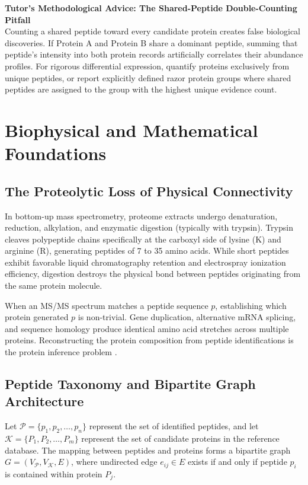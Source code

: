 \documentclass[11pt,twoside,openright]{book}
\begin{document}
\FloatBarrier

\begin{notebox}
\textbf{Tutor's Methodological Advice: The Shared-Peptide Double-Counting Pitfall}\\
Counting a shared peptide toward every candidate protein creates false biological discoveries. If Protein A and Protein B share a dominant peptide, summing that peptide's intensity into both protein records artificially correlates their abundance profiles. For rigorous differential expression, quantify proteins exclusively from unique peptides, or report explicitly defined razor protein groups where shared peptides are assigned to the group with the highest unique evidence count.
\end{notebox}

\section{Biophysical and Mathematical Foundations}

\subsection{The Proteolytic Loss of Physical Connectivity}
In bottom-up mass spectrometry, proteome extracts undergo denaturation, reduction, alkylation, and enzymatic digestion (typically with trypsin). Trypsin cleaves polypeptide chains specifically at the carboxyl side of lysine ($\text{K}$) and arginine ($\text{R}$), generating peptides of 7 to 35 amino acids. While short peptides exhibit favorable liquid chromatography retention and electrospray ionization efficiency, digestion destroys the physical bond between peptides originating from the same protein molecule.

When an MS/MS spectrum matches a peptide sequence $p$, establishing which protein generated $p$ is non-trivial. Gene duplication, alternative mRNA splicing, and sequence homology produce identical amino acid stretches across multiple proteins. Reconstructing the protein composition from peptide identifications is the protein inference problem \cite{nesvizhskii2005interpretation, nesvizhskii2003statistical, serang2012efficient}.

\subsection{Peptide Taxonomy and Bipartite Graph Architecture}
Let $\mathcal{P} = \{p_1, p_2, \dots, p_n\}$ represent the set of identified peptides, and let $\mathcal{K} = \{P_1, P_2, \dots, P_m\}$ represent the set of candidate proteins in the reference database. The mapping between peptides and proteins forms a bipartite graph $G = (V_{\mathcal{P}}, V_{\mathcal{K}}, E)$, where undirected edge $e_{ij} \in E$ exists if and only if peptide $p_i$ is contained within protein $P_j$.
\end{document}
